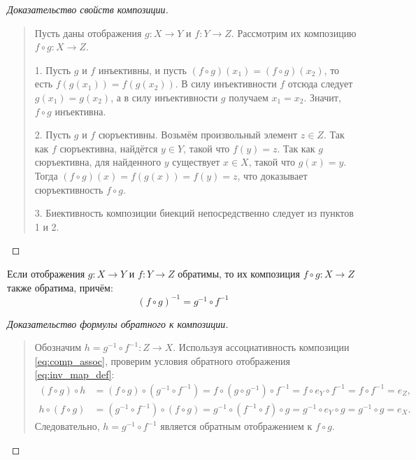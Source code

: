 \begin{proof}[Доказательство свойств композиции]~\\
    \begin{quote}
        Пусть даны отображения $g: X \to Y$ и $f: Y \to Z$. Рассмотрим их 
        композицию $f \circ g: X \to Z$.

        1. Пусть $g$ и $f$ инъективны, и пусть $(f \circ g)(x_1) = 
        (f \circ g)(x_2)$, то есть $f(g(x_1)) = f(g(x_2))$. В силу 
        инъективности $f$ отсюда следует $g(x_1) = g(x_2)$, а в силу 
        инъективности $g$ получаем $x_1 = x_2$. Значит, $f \circ g$ 
        инъективна.

        2. Пусть $g$ и $f$ сюръективны. Возьмём произвольный элемент 
        $z \in Z$. Так как $f$ сюръективна, найдётся $y \in Y$, такой что 
        $f(y) = z$. Так как $g$ сюръективна, для найденного $y$ существует 
        $x \in X$, такой что $g(x) = y$. Тогда $(f \circ g)(x) = f(g(x)) = 
        f(y) = z$, что доказывает сюръективность $f \circ g$.

        3. Биективность композиции биекций непосредственно следует из 
        пунктов 1 и 2.
    \end{quote}
\end{proof}

\begin{theorem}
    Если отображения $g: X \to Y$ и $f: Y \to Z$ обратимы, то их 
    композиция $f \circ g: X \to Z$ также обратима, причём:
    \begin{equation} \label{eq:comp_inv}
        (f \circ g)^{-1} = g^{-1} \circ f^{-1} \tag{11}
    \end{equation}
\end{theorem}

\begin{proof}[Доказательство формулы обратного к композиции]~\\
    \begin{quote}
        Обозначим $h = g^{-1} \circ f^{-1}: Z \to X$. Используя 
        ассоциативность композиции \eqref{eq:comp_assoc}, проверим условия 
        обратного отображения \eqref{eq:inv_map_def}:
        \begin{align*}
            (f \circ g) \circ h &= (f \circ g) \circ (g^{-1} \circ f^{-1}) = 
            f \circ (g \circ g^{-1}) \circ f^{-1} = 
            f \circ e_Y \circ f^{-1} = f \circ f^{-1} = e_Z, \\
            h \circ (f \circ g) &= (g^{-1} \circ f^{-1}) \circ (f \circ g) = 
            g^{-1} \circ (f^{-1} \circ f) \circ g = 
            g^{-1} \circ e_Y \circ g = g^{-1} \circ g = e_X.
        \end{align*}
        Следовательно, $h = g^{-1} \circ f^{-1}$ является обратным 
        отображением к $f \circ g$.
    \end{quote}
\end{proof}


